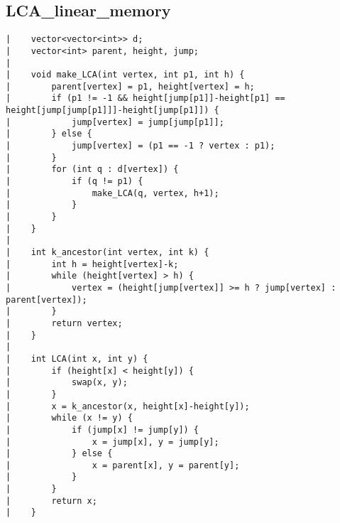 \documentclass[a4paper, 10pt]{article}
\begin{document}
\begin{center}
\section*{LCA\_linear\_memory}
\begin{verbatim}
|    vector<vector<int>> d;
|    vector<int> parent, height, jump;
|    
|    void make_LCA(int vertex, int p1, int h) {
|        parent[vertex] = p1, height[vertex] = h;
|        if (p1 != -1 && height[jump[p1]]-height[p1] == height[jump[jump[p1]]]-height[jump[p1]]) {
|            jump[vertex] = jump[jump[p1]];
|        } else {
|            jump[vertex] = (p1 == -1 ? vertex : p1);
|        }
|        for (int q : d[vertex]) {
|            if (q != p1) {
|                make_LCA(q, vertex, h+1);
|            }
|        }
|    }
|    
|    int k_ancestor(int vertex, int k) {
|        int h = height[vertex]-k;
|        while (height[vertex] > h) {
|            vertex = (height[jump[vertex]] >= h ? jump[vertex] : parent[vertex]);
|        }
|        return vertex;
|    }
|    
|    int LCA(int x, int y) {
|        if (height[x] < height[y]) {
|            swap(x, y);
|        }
|        x = k_ancestor(x, height[x]-height[y]);
|        while (x != y) {
|            if (jump[x] != jump[y]) {
|                x = jump[x], y = jump[y];
|            } else {
|                x = parent[x], y = parent[y];
|            }
|        }
|        return x;
|    }
\end{verbatim}


\end{center}
\end{document}
